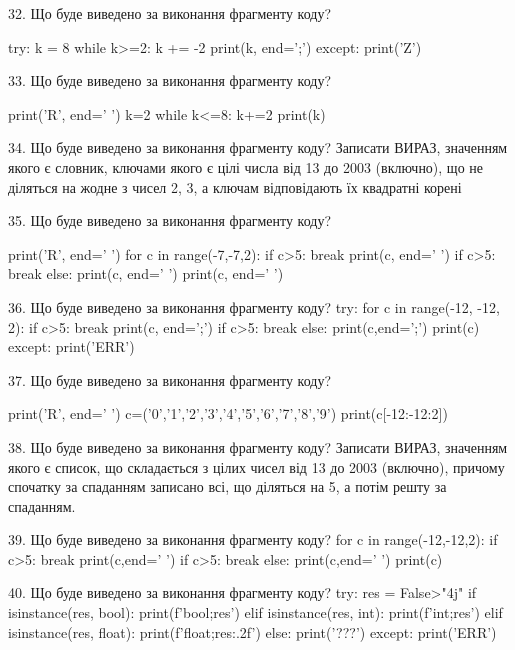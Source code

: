 \documentclass[11pt]{article}
\begin{document}

32. Що буде виведено за виконання фрагменту коду?

try:
    k = 8
    while k>=2:
        k += -2
    print(k, end=';')
except:
    print('Z')



33. Що буде виведено за виконання фрагменту коду?

print('R', end=' ')
k=2
while k<=8:
    k+=2
print(k)



34. Що буде виведено за виконання фрагменту коду?
Записати ВИРАЗ, значенням якого є словник, ключами якого є цілі числа від 13 до 2003 (включно), що не діляться на жодне з чисел 2, 3, а ключам відповідають їх квадратні корені 


35. Що буде виведено за виконання фрагменту коду?

print('R', end=' ')
for c in range(-7,-7,2):
    if c>5:
        break
        print(c, end=' ')
    if c>5:
        break
    else:
        print(c, end=' ')
    print(c, end=' ')


36. Що буде виведено за виконання фрагменту коду?
try:
    for c in range(-12, -12, 2):
        if c>5:
            break
        print(c, end=';')
        if c>5:
            break
    else:
        print(c,end=';')
    print(c)
except:
    print('ERR')


37. Що буде виведено за виконання фрагменту коду?

print('R', end=' ')
c=('0','1','2','3','4','5','6','7','8','9')
print(c[-12:-12:2])



38. Що буде виведено за виконання фрагменту коду?
Записати ВИРАЗ, значенням якого є список, що складається з цілих чисел від 13 до 2003 (включно), причому спочатку за спаданням записано всі, що діляться на 5, а потім решту за спаданням.

39. Що буде виведено за виконання фрагменту коду?
for c in range(-12,-12,2):
    if c>5:
        break
        print(c,end=' ')
    if c>5:
        break
    else:
        print(c,end=' ')
    print(c)


40. Що буде виведено за виконання фрагменту коду?
try:
    res = False>"4j"
    if isinstance(res, bool):
        print(f'bool;{res}')
    elif isinstance(res, int):
        print(f'int;{res}')
    elif isinstance(res, float):
        print(f'float;{res:.2f}')
    else:
        print('???')
except:
    print('ERR')
\end{document}
